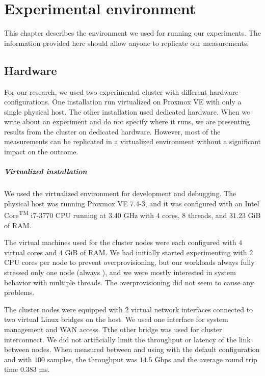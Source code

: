 \chapter{Experimental environment}
\label{chap:env}

This chapter describes the environment we used for running our experiments. The information provided here should allow anyone to replicate our measurements.

\section{Hardware}
\label{sec:hw-env}

For our research, we used two experimental cluster with different hardware configurations. One installation run virtualized on Proxmox VE with only a single physical host. The other installation used dedicated hardware. When we write about an experiment and do not specify where it runs, we are presenting results from the cluster on dedicated hardware. However, most of the measurements can be replicated in a virtualized environment without a significant impact on the outcome.

\paragraph{Virtualized installation}
We used the virtualized environment for development and debugging. The physical host was running Proxmox VE 7.4-3, and it was configured with an Intel\textsuperscript{\textregistered} Core\textsuperscript{TM} i7-3770 CPU running at 3.40 GHz with $4$ cores, $8$ threads, and $31.23$ GiB of RAM.

The virtual machines used for the cluster nodes were each configured with $4$ virtual cores and $4$ GiB of RAM. We had initially started experimenting with $2$ CPU cores per node to prevent overprovisioning, but our workloads always fully stressed only one node (always ), and we were mostly interested in system behavior with multiple threads. The overprovisioning did not seem to cause any problems.

The cluster nodes were equipped with $2$ virtual network interfaces connected to two virtual Linux bridges on the host. We used one interface for system management and WAN access. Tthe other bridge was used for cluster interconnect. We did not artificially limit the throughput or latency of the link between nodes. When measured between  and  using  with the default configuration and  with $100$ samples, the throughput was $14.5$ Gbps and the average round trip time $0.383$ ms.

